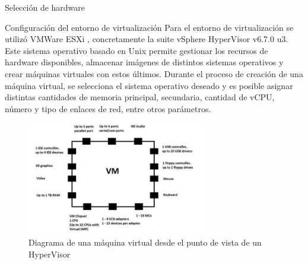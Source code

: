 \begin{section}{Selección de hardware}
        \begin{subsection}{Configuración del entorno de virtualización}
        Para el entorno de virtualización se utilizó VMWare ESXi \cite{vmware}, concretamente la suite vSphere HyperVisor v6.7.0 u3. Este sistema operativo basado en Unix permite gestionar los recursos de hardware disponibles, almacenar imágenes de distintos sistemas operativos y crear máquinas virtuales con estos últimos. Durante el proceso de creación de una máquina virtual, se selecciona el sistema operativo deseado y es posible asignar distintas cantidades de memoria principal, secundaria, cantidad de vCPU, número y tipo de enlaces de red, entre otros parámetros. \par
         \begin{figure}[H]
          \centering
           \includegraphics[width=0.7\textwidth]{./iteracion_1_imagenes/figura_34_diagrama_VM.png}
            \caption{ Diagrama de una máquina virtual desde el punto de vista de un HyperVisor\cite{vmware}}
            \label{fig:maquina_virtual}
        \end{figure}
        \end{subsection}
        

\end{section}

